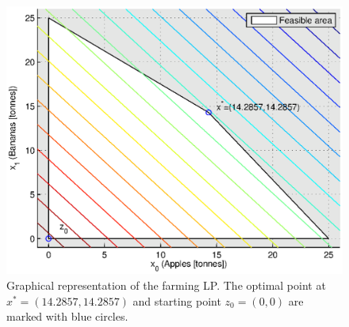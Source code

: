 \begin{figure}[H]
\centering
\includegraphics[width=\textwidth]{figures/FarmingLP.eps}
\caption{Graphical representation of the farming LP. The optimal point at $x^*=(14.2857,14.2857)$ and starting point $z_0 = (0,0)$ are marked with blue circles.}
\label{fig:farmingLP}
\end{figure}

